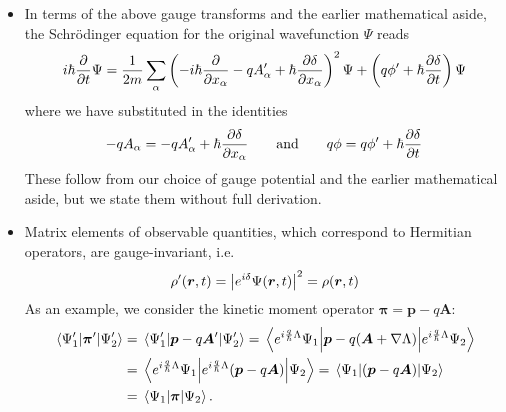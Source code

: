 \documentclass[11pt, a4paper]{article}
\renewcommand{\grad}{\nabla}
\newcommand{\eqtext}[1]{\qquad \text{#1} \qquad}
\newcommand{\Schro}{Schr\"{o}dinger\xspace}
\newcommand{\Herm}{Hermitian\xspace}
\renewcommand{\vec}[1]{\bm{#1}}  %
\renewcommand{\r}{\vec{r}}  %
\newcommand{\A}{\vec{A}}  %
\newcommand{\p}{\psi}  %
\renewcommand{\P}{\Psi}  %
\begin{document}
\begin{itemize}
	\item In terms of the above gauge transforms and the earlier mathematical aside, the \Schro equation for the original wavefunction $ \P $ reads
	\begin{equation*}
		i\hbar \pdv{t}\P = \frac{1}{2m}\sum_{\alpha}\left(-i\hbar \pdv{x_{\alpha}} - q A'_{\alpha} + \hbar \pdv{\delta}{x_{\alpha}}\right)^{2} \P + \left(q\phi' + \hbar \pdv{\delta}{t}\right)\P
	\end{equation*}
	where we have substituted in the identities
	\begin{equation*}
		-qA_{\alpha} = -qA'_{\alpha} + \hbar \pdv{\delta}{x_{\alpha}} \eqtext{and} q\phi = q\phi' + \hbar \pdv{\delta}{t} 
	\end{equation*}
	These follow from our choice of gauge potential and the earlier mathematical aside, but we state them without full derivation.
	
	\item Matrix elements of observable quantities, which correspond to \Herm operators, are gauge-invariant, i.e.
	\begin{equation*}
		\rho'(\r, t) = \abs{e^{i\delta}\P(\r, t)}^{2} = \rho(\r, t)
	\end{equation*}
    As an example, we consider the kinetic moment operator $ \vec{\pi} = \vec{p} - q\A $:
	\begin{align*}
		\mel{\P_{1}'}{\vec{\pi}'}{\P_{2}'} & = \mel{\P_{1}'}{\vec{p} - q\A'}{\P_{2}'} = \mel{e^{i\frac{q}{\hbar}\Lambda}\P_{1}}{\vec{p} - q(\A + \grad \Lambda)}{e^{i\frac{q}{\hbar}\Lambda}\P_{2}}\\
		& =  \mel{e^{i\frac{q}{\hbar}\Lambda}\P_{1}}{e^{i\frac{q}{\hbar}\Lambda}(\vec{p} - q \A)}{\P_{2}} = \mel{\P_{1}}{(\vec{p} - q\A)}{\P_{2}}\\
		& = \mel{\P_{1}}{\vec{\pi}}{\P_{2}}.
	\end{align*}
	
	\iffalse


	As a result of $ \vec{\pi} $ being gauge invariant instead of $ \vec{\p} $, in an electromagnetic field we modify the definitino of probability current to
	\begin{equation*}
		\vec{j}(\r, t) = \frac{1}{m} \Re \big[\P^{*}(\r, t)\vec{\pi}\P(\r, t)\big]
	\end{equation*}
	\fi 
	
\end{itemize}
\end{document}
